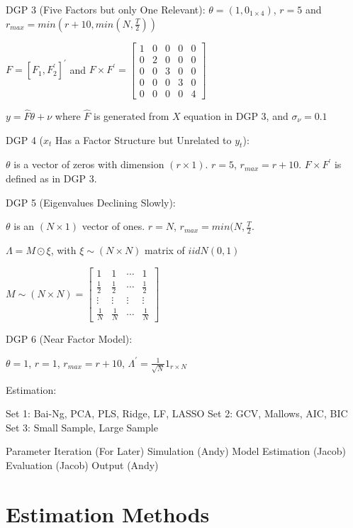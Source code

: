 DGP 3 (Five Factors but only One Relevant):
$\theta = (1, 0_{1 \times 4})$, $r = 5$ and $r_{max} = min(r + 10, min(N, \frac{T}{2}))$

$F = [F_{1}, F_{2}^{'}]^{'}$ and $F \times F^{'} = \begin{bmatrix} 1 & 0 & 0 & 0 & 0 \\ 0 & 2 & 0 & 0 & 0 \\ 0 & 0 & 3 & 0 & 0 \\ 0 & 0 & 0 & 3 & 0 \\ 0 & 0 & 0 & 0 & 4\end{bmatrix}$

$y = \hat{F} \theta + \nu$ where $\hat{F}$ is generated from $X$ equation in DGP 3, and $\sigma_{\nu} = 0.1$

DGP 4 ($x_{t}$ Has a Factor Structure but Unrelated to $y_{t}$):

$\theta$ is a vector of zeros with dimension $(r \times 1)$. $r = 5$, $r_{max} = r + 10$. $F \times F^{'}$ is defined as in DGP 3.

DGP 5 (Eigenvalues Declining Slowly):

$\theta$ is an $(N \times 1)$ vector of ones. $r = N$, $r_{max} = min(N, \frac{T}{2}$.

$\Lambda = M \odot \xi$, with $\xi \sim (N \times N)$ matrix of $iidN(0, 1)$

$M \sim (N \times N) = \begin{bmatrix} 1 & 1 & \dotsb & 1 \\ \frac{1}{2} & \frac{1}{2} & \dotsb & \frac{1}{2} \\ \vdots & \vdots & \vdots & \vdots \\ \frac{1}{N} & \frac{1}{N} & \dotsb & \frac{1}{N}\end{bmatrix}$

DGP 6 (Near Factor Model):

$\theta = 1$, $r = 1$, $r_{max} = r + 10$, $\Lambda^{'} = \frac{1}{\sqrt{N}}1_{r \times N}$


Estimation:

Set 1: Bai-Ng, PCA, PLS, Ridge, LF, LASSO
Set 2: GCV, Mallows, AIC, BIC
Set 3: Small Sample, Large Sample

Parameter Iteration (For Later)
Simulation (Andy)
Model Estimation (Jacob)
Evaluation (Jacob)
Output (Andy)

\section{Estimation Methods}

